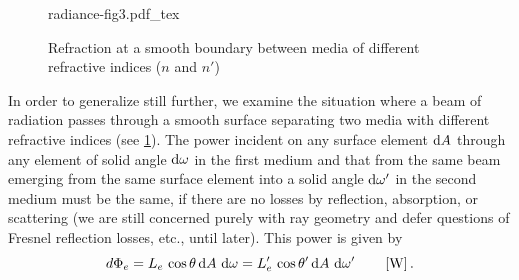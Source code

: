 \begin{refsection}
\begin{figure}
	\begin{center}
		{radiance-fig3.pdf_tex}	
	\end{center}
	\caption{Refraction at a smooth boundary between media of
		different refractive indices ($n$ and $n'$)}
	\label{fig:nicodemus3}
\end{figure}

In order to generalize still further, we examine the situation where a beam of
radiation passes through a smooth surface separating two media with different
refractive indices (see \cref{fig:nicodemus3}). The power incident on any
surface element $\mathop{}\!\mathrm{d} A$ through any element of solid angle $\mathop{}\!\mathrm{d} \omega$ in the first
medium and that from the same beam emerging from the same surface element into
a solid angle $\mathop{}\!\mathrm{d} \omega'$ in the second medium must be the same, if there are no
losses by reflection, absorption, or scattering (we are still concerned purely
with ray geometry and defer questions of Fresnel reflection losses, etc., until
later). This power is given by
\begin{equation}\label{eqn:nicodemus13}
d\Phi_e = L_e\,\cos\theta \d A\, \d \omega = L_e'\,\cos\theta' \d A\, \d \omega'
\qquad \left[\unit{\watt}\right].
\end{equation}


\end{refsection}
